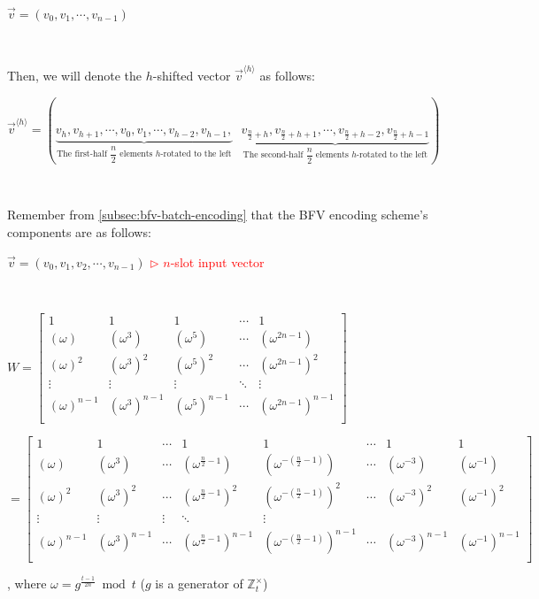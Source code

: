 $\vec{v} = (v_0, v_1, \cdots, v_{n-1})$

$ $

Then, we will denote the $h$-shifted vector $\vec{v}^{\langle h \rangle}$ as follows:  

$\vec{v}^{\langle h \rangle} = (\underbrace{v_h, v_{h+1}, \cdots, v_0, v_1, \cdots, v_{h-2}, v_{h-1},}_{\text{The first-half $\dfrac{n}{2}$ elements $h$-rotated to the left}} \text{ } \underbrace{v_{\frac{n}{2}+h}, v_{\frac{n}{2}+h+1}, \cdots, v_{\frac{n}{2}+h-2}, v_{\frac{n}{2}+h-1}}_{\text{The second-half $\dfrac{n}{2}$ elements $h$-rotated to the left}})$

$ $

Remember from \autoref{subsec:bfv-batch-encoding} that the BFV encoding scheme's components are as follows:

$\vec{v} = (v_0, v_1, v_2, \cdots, v_{n-1})$ \textcolor{red}{  $\rhd$ $n$-slot input vector}

$ $

$W =  \begin{bmatrix}
1 & 1 & 1 & \cdots & 1\\
(\omega) & (\omega^3) & (\omega^5) & \cdots & (\omega^{2n-1})\\
(\omega)^2 & (\omega^3)^2 & (\omega^5)^2 & \cdots & (\omega^{2n-1})^2\\
\vdots & \vdots & \vdots & \ddots & \vdots \\
(\omega)^{n-1} & (\omega^3)^{n-1} & (\omega^5)^{n-1} & \cdots & (\omega^{2n-1})^{n-1}\\
\end{bmatrix}$

$= \begin{bmatrix}
1 & 1 & \cdots & 1 & 1 & \cdots & 1 & 1\\
(\omega) & (\omega^3) & \cdots & (\omega^{\frac{n}{2} - 1}) & (\omega^{-(\frac{n}{2} - 1)}) & \cdots & (\omega^{-3}) & (\omega^{-1})\\
(\omega)^2 & (\omega^3)^2 & \cdots & (\omega^{\frac{n}{2} - 1})^2 & (\omega^{-(\frac{n}{2} - 1)})^2 & \cdots & (\omega^{-3})^2 & (\omega^{-1})^2\\
\vdots & \vdots & \vdots & \ddots & \vdots \\
(\omega)^{n-1} & (\omega^3)^{n-1} & \cdots & (\omega^{\frac{n}{2} - 1})^{n-1} & (\omega^{-(\frac{n}{2} - 1)})^{n-1} & \cdots & (\omega^{-3})^{n-1} & (\omega^{-1})^{n-1}\\
\end{bmatrix}$

, where $\omega = g^{\frac{t - 1}{2n}} \bmod t$ ($g$ is a generator of $\mathbb{Z}_t^{\times}$)

